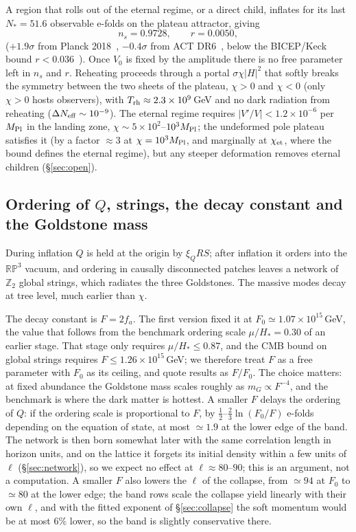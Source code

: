 \documentclass[11pt,a4paper]{article}
\newcommand{\RP}{\mathbb{RP}^3}
\newcommand{\Ztwo}{\mathbb{Z}_2}
\newcommand{\Mpl}{M_{\rm Pl}}
\begin{document}
A region that rolls out of the eternal regime, or a direct child, inflates for its last $N_* = 51.6$ observable e-folds on the plateau attractor, giving
\begin{equation}
n_s = 0.9728,\qquad r = 0.0050,
\end{equation}
($+1.9\sigma$ from Planck 2018~\cite{Planck2018X}, $-0.4\sigma$ from ACT DR6~\cite{ACTDR6}, below the BICEP/Keck bound $r<0.036$~\cite{BK18}).
Once $V_0$ is fixed by the amplitude there is no free parameter left in $n_s$ and $r$.
Reheating proceeds through a portal $\sigma\chi|H|^2$ that softly breaks the symmetry between the two sheets of the plateau, $\chi>0$ and $\chi<0$ (only $\chi>0$ hosts observers), with $T_{\rm rh}\approx2.3\times10^{9}$\,GeV and no dark radiation from reheating ($\Delta N_{\rm eff}\sim10^{-9}$).
The eternal regime requires $|V'/V| < 1.2\times10^{-6}$ per $\Mpl$ in the landing zone, $\chi\sim 5\times10^2$--$10^3\Mpl$; the undeformed pole plateau satisfies it (by a factor $\approx3$ at $\chi=10^3\Mpl$, and marginally at $\chi_{\rm et}$, where the bound defines the eternal regime), but any steeper deformation removes eternal children (\S\ref{sec:open}).

\subsection{Ordering of $Q$, strings, the decay constant and the Goldstone mass}
\label{sec:F}

During inflation $Q$ is held at the origin by $\xi_Q R S$; after inflation it orders into the $\RP$ vacuum, and ordering in causally disconnected patches leaves a network of $\Ztwo$ global strings, which radiates the three Goldstones.
The massive modes decay at tree level, much earlier than $\chi$.

The decay constant is $F=2f_a$.
The first version fixed it at $F_0\simeq1.07\times10^{15}$\,GeV, the value that follows from the benchmark ordering scale $\mu/H_*=0.30$ of an earlier stage.
That stage only requires $\mu/H_*\le0.87$, and the CMB bound on global strings requires $F\le1.26\times10^{15}$\,GeV; we therefore treat $F$ as a free parameter with $F_0$ as its ceiling, and quote results as $F/F_0$.
The choice matters: at fixed abundance the Goldstone mass scales roughly as $m_G\propto F^{-4}$, and the benchmark is where the dark matter is hottest.
A smaller $F$ delays the ordering of $Q$: if the ordering scale is proportional to $F$, by $\tfrac12$--$\tfrac23\ln(F_0/F)$ e-folds depending on the equation of state, at most $\simeq1.9$ at the lower edge of the band. The network is then born somewhat later with the same correlation length in horizon units, and on the lattice it forgets its initial density within a few units of $\ell$ (\S\ref{sec:network}), so we expect no effect at $\ell\approx80$--$90$; this is an argument, not a computation. A smaller $F$ also lowers the $\ell$ of the collapse, from $\simeq94$ at $F_0$ to $\simeq80$ at the lower edge; the band rows scale the collapse yield linearly with their own $\ell$, and with the fitted exponent of \S\ref{sec:collapse} the soft momentum would be at most $6\%$ lower, so the band is slightly conservative there.
\end{document}
